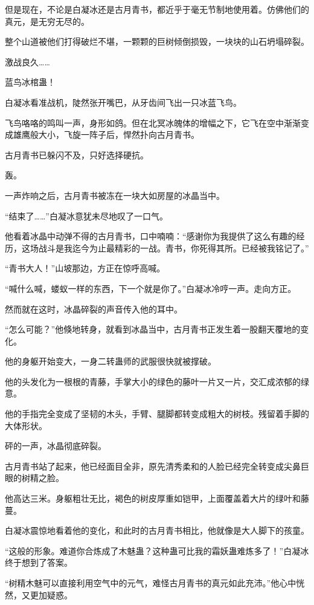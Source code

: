 \begin{this_body}
但是现在，不论是白凝冰还是古月青书，都近乎于毫无节制地使用着。仿佛他们的真元，是无穷无尽的。

整个山道被他们打得破烂不堪，一颗颗的巨树倾倒损毁，一块块的山石坍塌碎裂。

激战良久……

蓝鸟冰棺蛊！

白凝冰看准战机，陡然张开嘴巴，从牙齿间飞出一只冰蓝飞鸟。

飞鸟咯咯的鸣叫一声，身形如鸽。但在北冥冰魄体的增幅之下，它飞在空中渐渐变成雄鹰般大小，飞旋一阵子后，悍然扑向古月青书。

古月青书已躲闪不及，只好选择硬抗。

轰。

一声炸响之后，古月青书被冻在一块大如房屋的冰晶当中。

“结束了……”白凝冰意犹未尽地叹了一口气。

他看着冰晶中动弹不得的古月青书，口中喃喃：“感谢你为我提供了这么有趣的经历，这场战斗是我迄今为止最精彩的一战。青书，你死得其所。已经被我铭记了。”

“青书大人！”山坡那边，方正在惊呼高喊。

“喊什么喊，蝼蚁一样的东西，下一个就是你了。”白凝冰冷哼一声。走向方正。

然而就在这时，冰晶碎裂的声音传入他的耳中。

“怎么可能？”他倏地转身，就看到冰晶当中，古月青书正发生着一股翻天覆地的变化。

他的身躯开始变大，一身二转蛊师的武服很快就被撑破。

他的头发化为一根根的青藤，手掌大小的绿色的藤叶一片又一片，交汇成浓郁的绿意。

他的手指完全变成了坚韧的木头，手臂、腿脚都转变成粗大的树枝。残留着手脚的大体形状。

砰的一声，冰晶彻底碎裂。

古月青书站了起来，他已经面目全非，原先清秀柔和的人脸已经完全转变成尖鼻巨眼的树精之脸。

他高达三米。身躯粗壮无比，褐色的树皮厚重如铠甲，上面覆盖着大片的绿叶和藤蔓。

白凝冰震惊地看着他的变化，和此时的古月青书相比，他就像是大人脚下的孩童。

“这般的形象。难道你合炼成了木魅蛊？这种蛊可比我的霜妖蛊难炼多了！”白凝冰终于想到了答案。

“树精木魅可以直接利用空气中的元气，难怪古月青书的真元如此充沛。”他心中恍然，又更加疑惑。


\end{this_body}
